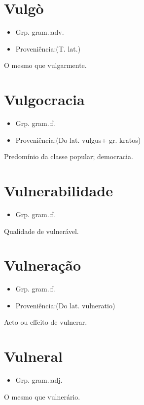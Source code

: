 \documentclass{article}
\begin{document}
\section{Vulgò}
\begin{itemize}
\item {Grp. gram.:adv.}
\end{itemize}
\begin{itemize}
\item {Proveniência:(T. lat.)}
\end{itemize}
O mesmo que \textunderscore vulgarmente\textunderscore .
\section{Vulgocracia}
\begin{itemize}
\item {Grp. gram.:f.}
\end{itemize}
\begin{itemize}
\item {Proveniência:(Do lat. \textunderscore vulgus\textunderscore  + gr. \textunderscore kratos\textunderscore )}
\end{itemize}
Predomínio da classe popular; democracia.
\section{Vulnerabilidade}
\begin{itemize}
\item {Grp. gram.:f.}
\end{itemize}
Qualidade de vulnerável.
\section{Vulneração}
\begin{itemize}
\item {Grp. gram.:f.}
\end{itemize}
\begin{itemize}
\item {Proveniência:(Do lat. \textunderscore vulneratio\textunderscore )}
\end{itemize}
Acto ou effeito de vulnerar.
\section{Vulneral}
\begin{itemize}
\item {Grp. gram.:adj.}
\end{itemize}
O mesmo que \textunderscore vulnerário\textunderscore .
\end{document}
